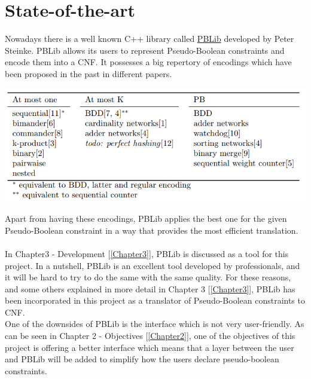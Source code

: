 \section{State-of-the-art}



Nowadays there is a well known C++ library called \href{http://tools.computational-logic.org/content/pblib.php}{PBLib} developed by Peter Steinke. PBLib allows its users to represent Pseudo-Boolean constraints and encode them into a CNF.  
It possesses a big repertory of encodings which have been proposed in the past in different papers\cite{Steinke2015}.  
\begin{center}
	\includegraphics[width=1\textwidth]{Figures/PBLibEncodings.png}
\end{center}
Apart from having these encodings, PBLib applies the best one for the given Pseudo-Boolean constraint in a way that provides the most efficient translation. \\\\
In Chapter3 - Development [\ref{Chapter3}], PBLib is discussed as a tool for this project. In a nutshell, PBLib is an excellent tool developed by professionals, and it will be hard to try to do the same with the same quality. For these reasons, and some others explained in more detail in Chapter 3 [\ref{Chapter3}], PBLib has been incorporated in this project as a translator of Pseudo-Boolean constraints to CNF.  \\
One of the downsides of PBLib is the interface which is not very user-friendly. As can be seen in Chapter 2 -  Objectives [\ref{Chapter2}], one of the objectives of this project is offering a better interface which means that a layer between the user and PBLib will be added to simplify how the users declare pseudo-boolean constraints.  

